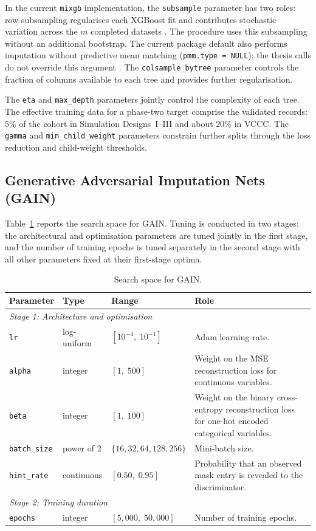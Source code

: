 In the current \texttt{mixgb} implementation, the \texttt{subsample} parameter has two roles: row subsampling regularises each XGBoost fit and contributes stochastic variation across the $m$ completed datasets \citep{deng2024multiple}. The procedure uses this subsampling without an additional bootstrap. The current package default also performs imputation without predictive mean matching (\texttt{pmm.type = NULL}); the thesis calls do not override this argument \citep{deng2026mixgb}. The \texttt{colsample\_bytree} parameter controls the fraction of columns available to each tree and provides further regularisation.

The \texttt{eta} and \texttt{max\_depth} parameters jointly control the complexity of each tree. The effective training data for a phase-two target comprise the validated records: $5\%$ of the cohort in Simulation Designs~I--III and about $20\%$ in VCCC. The \texttt{gamma} and \texttt{min\_child\_weight} parameters constrain further splits through the loss reduction and child-weight thresholds.

\subsection{Generative Adversarial Imputation Nets (GAIN)}

Table~\ref{tab:tune_gain} reports the search space for GAIN. Tuning is conducted in two stages: the architectural and optimisation parameters are tuned jointly in the first stage, and the number of training epochs is tuned separately in the second stage with all other parameters fixed at their first-stage optima.

\begin{table}[ht]
\centering
\caption{Search space for GAIN.}
\label{tab:tune_gain}
\begin{tabularx}{\textwidth}{lll>{\raggedright\arraybackslash}X}
\toprule
Parameter & Type & Range & Role \\
\midrule
\multicolumn{4}{l}{\textit{Stage 1: Architecture and optimisation}} \\
\texttt{lr} & log-uniform & $[10^{-4},\; 10^{-1}]$ &
    Adam learning rate. \\
\texttt{alpha} & integer & $[1,\; 500]$ &
    Weight on the MSE reconstruction loss for continuous variables. \\
\texttt{beta} & integer & $[1,\; 100]$ &
    Weight on the binary cross-entropy reconstruction loss for one-hot encoded
    categorical variables. \\
\texttt{batch\_size} & power of 2 & $\{16, 32, 64, 128, 256\}$ &
    Mini-batch size. \\
\texttt{hint\_rate} & continuous & $[0.50,\; 0.95]$ &
    Probability that an observed mask entry is revealed to the
    discriminator. \\
\midrule
\multicolumn{4}{l}{\textit{Stage 2: Training duration}} \\
\texttt{epochs} & integer & $[5{,}000,\; 50{,}000]$ &
    Number of training epochs. \\
\bottomrule
\end{tabularx}
\end{table}

